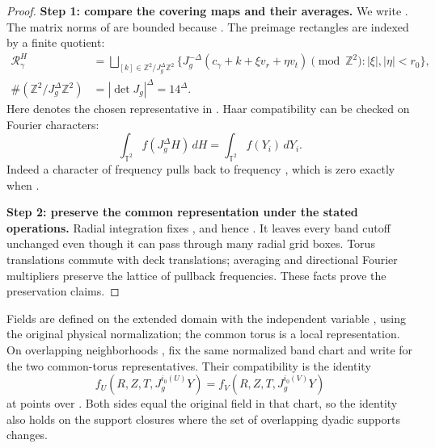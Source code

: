 \begin{proof}
\textbf{Step 1: compare the covering maps and their averages.} We write
. The matrix norms of
 are bounded because
. The preimage rectangles are
indexed by a finite quotient:
\[
  \begin{aligned}
  \mathcal R_\gamma^H
    &=\bigsqcup_{[k]\in\mathbb Z^2/J_g^\Delta\mathbb Z^2}
      \bigl\{J_g^{-\Delta}(c_\gamma+k+\xi v_r+\eta v_t)
      \pmod{\mathbb Z^2}:|\xi|,|\eta|<r_0\bigr\},\\
  \#(\mathbb Z^2/J_g^\Delta\mathbb Z^2)
    &=|\det J_g|^\Delta=14^\Delta.
  \end{aligned}
\]
Here  denotes the chosen representative in
. Haar compatibility can be checked on
Fourier characters:
\begin{equation}
  \int_{\mathbb T^2} f(J_g^\Delta H)\,dH
  =\int_{\mathbb T^2} f(Y_i)\,dY_i.
  \tag{6.19}\label{eq:6.19}
\end{equation}
Indeed a character of frequency  pulls back to
frequency , which is zero exactly when
.

\textbf{Step 2: preserve the common representation under the stated
operations.} Radial integration fixes , and hence
. It leaves every band cutoff unchanged even
though it can pass through many radial grid boxes. Torus translations commute
with deck translations; averaging and directional Fourier multipliers preserve
the lattice of pullback frequencies. These facts prove the preservation
claims.
\end{proof}

Fields are defined on the extended domain with the independent variable
, using the original physical normalization; the common
torus is a local representation. On overlapping neighborhoods
, fix the same normalized band chart and write
 for the two common-torus representatives. Their
compatibility is the identity
\begin{equation}
  f_U(R,Z,T,J_g^{i_0(U)}Y)=f_V(R,Z,T,J_g^{i_0(V)}Y)
  \tag{6.20}\label{eq:6.20}
\end{equation}
at points over . Both sides equal the original
field in that chart, so the identity also holds on the support closures where
the set of overlapping dyadic supports changes.

